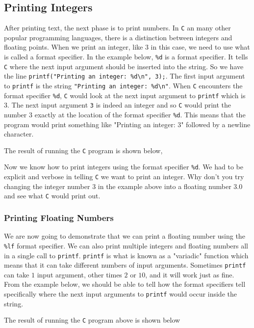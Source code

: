 \documentclass[a4paper, 12pt]{report}
\begin{document}
\begin{center}
\subsection{Printing Integers}
\begin{comment}
\end{comment}
After printing text, the next phase is to print numbers. 
In \texttt{C} an many other popular programming languages, there is a distinction between integers and floating points.
When we print an integer, like $3$ in this case, we need to use what is called a format specifier.
In the example below, \texttt{\%d} is a format specifier.
It tells \texttt{C} where the next input argument should be inserted into the string.
So we have the line \texttt{printf("Printing an integer: \%d\textbackslash n", 3);}. 
The first input argument to \texttt{printf} is the string \texttt{"Printing an integer: \%d\textbackslash n"}.
When \texttt{C} encounters the format specifier \texttt{\%d}, \texttt{C} would look at the next input argument to \texttt{printf}  which is $3$.
The next input argument \texttt{3} is indeed an integer and so  \texttt{C} would print the number $3$ exactly at the location of the format specifier \texttt{\%d}.
This means that the program would print something like "Printing an integer: 3" followed by a newline character.

The result of running the \texttt{C} program is shown below,

Now we know how to print integers using the format specifier \texttt{\%d}.
We had to be explicit and verbose in telling \texttt{C} we want to print an integer. 
Why don't you try changing the integer number $3$ in the example above into a floating number $3.0$ and see what \texttt{C} would print out.

\subsubsection{Printing Floating Numbers}
\begin{comment}
\end{comment}
We are now going to demonstrate that we can print a floating number using the \texttt{\%lf} format specifier. 
We can also print multiple integers and floating numbers all in a single call to \texttt{printf}. 
\texttt{printf} is what is known as a "variadic" function which means that it can take different numbers of input arguments. 
Sometimes \texttt{printf} can take $1$ input argument, other times $2$ or $10$, and it will work just as fine. 
From the example below, we should be able to tell how the format specifiers tell specifically where the next input arguments to \texttt{printf} would occur inside the string.

$$$$
The result of running the \texttt{C} program above is shown below



\end{center}
\end{document}
